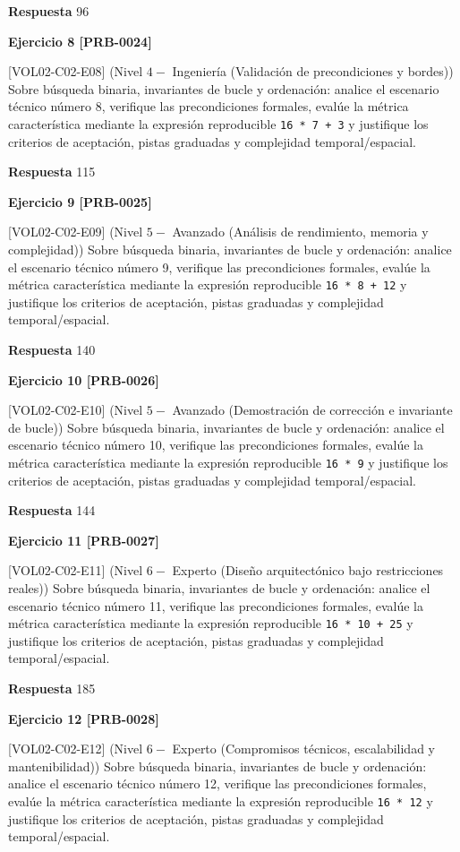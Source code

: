 \documentclass{book}
\begin{document}
\noindent\textbf{Respuesta} 96

\noindent\textbf{Ejercicio 8 [PRB-0024]}

[VOL02-C02-E08] (Nivel \(4 -\) Ingeniería (Validación de precondiciones y bordes)) Sobre búsqueda binaria, invariantes de bucle y ordenación: analice el escenario técnico número 8, verifique las precondiciones formales, evalúe la métrica característica mediante la expresión reproducible \texttt{16 * 7 + 3} y justifique los criterios de aceptación, pistas graduadas y complejidad temporal/espacial.

\noindent\textbf{Respuesta} 115

\noindent\textbf{Ejercicio 9 [PRB-0025]}

[VOL02-C02-E09] (Nivel \(5 -\) Avanzado (Análisis de rendimiento, memoria y complejidad)) Sobre búsqueda binaria, invariantes de bucle y ordenación: analice el escenario técnico número 9, verifique las precondiciones formales, evalúe la métrica característica mediante la expresión reproducible \texttt{16 * 8 + 12} y justifique los criterios de aceptación, pistas graduadas y complejidad temporal/espacial.

\noindent\textbf{Respuesta} 140

\noindent\textbf{Ejercicio 10 [PRB-0026]}

[VOL02-C02-E10] (Nivel \(5 -\) Avanzado (Demostración de corrección e invariante de bucle)) Sobre búsqueda binaria, invariantes de bucle y ordenación: analice el escenario técnico número 10, verifique las precondiciones formales, evalúe la métrica característica mediante la expresión reproducible \texttt{16 * 9} y justifique los criterios de aceptación, pistas graduadas y complejidad temporal/espacial.

\noindent\textbf{Respuesta} 144

\noindent\textbf{Ejercicio 11 [PRB-0027]}

[VOL02-C02-E11] (Nivel \(6 -\) Experto (Diseño arquitectónico bajo restricciones reales)) Sobre búsqueda binaria, invariantes de bucle y ordenación: analice el escenario técnico número 11, verifique las precondiciones formales, evalúe la métrica característica mediante la expresión reproducible \texttt{16 * 10 + 25} y justifique los criterios de aceptación, pistas graduadas y complejidad temporal/espacial.

\noindent\textbf{Respuesta} 185

\noindent\textbf{Ejercicio 12 [PRB-0028]}

[VOL02-C02-E12] (Nivel \(6 -\) Experto (Compromisos técnicos, escalabilidad y mantenibilidad)) Sobre búsqueda binaria, invariantes de bucle y ordenación: analice el escenario técnico número 12, verifique las precondiciones formales, evalúe la métrica característica mediante la expresión reproducible \texttt{16 * 12} y justifique los criterios de aceptación, pistas graduadas y complejidad temporal/espacial.
\end{document}
